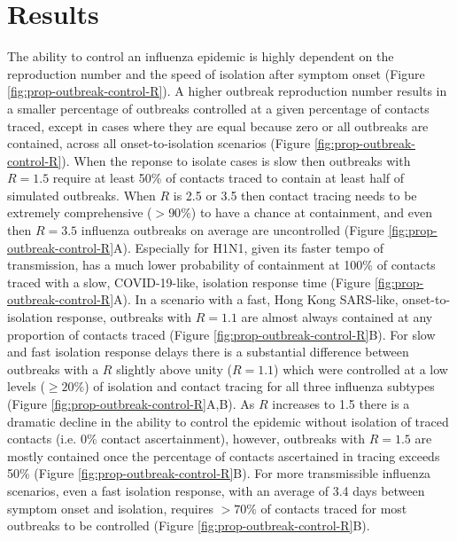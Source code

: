 \documentclass{article}
\begin{document}
\section*{Results}

The ability to control an influenza epidemic is highly dependent on the reproduction number and the speed of isolation after symptom onset (Figure \ref{fig:prop-outbreak-control-R}). A higher outbreak reproduction number results in a smaller percentage of outbreaks controlled at a given percentage of contacts traced, except in cases where they are equal because zero or all outbreaks are contained, across all onset-to-isolation scenarios (Figure \ref{fig:prop-outbreak-control-R}). When the reponse to isolate cases is slow then outbreaks with $R = 1.5$ require at least 50\% of contacts traced to contain at least half of simulated outbreaks. When $R$ is 2.5 or 3.5 then contact tracing needs to be extremely comprehensive ($>90\%$) to have a chance at containment, and even then $R = 3.5$ influenza outbreaks on average are uncontrolled (Figure \ref{fig:prop-outbreak-control-R}A). Especially for H1N1, given its faster tempo of transmission, has a much lower probability of containment at 100\% of contacts traced with a slow, COVID-19-like, isolation response time (Figure \ref{fig:prop-outbreak-control-R}A). In a scenario with a fast, Hong Kong SARS-like, onset-to-isolation response, outbreaks with $R = 1.1$ are almost always contained at any proportion of contacts traced (Figure \ref{fig:prop-outbreak-control-R}B). For slow and fast isolation response delays there is a substantial difference between outbreaks with a $R$ slightly above unity ($R = 1.1$) which were controlled at a low levels ($\geq 20\%$) of isolation and contact tracing for all three influenza subtypes (Figure \ref{fig:prop-outbreak-control-R}A,B). As $R$ increases to 1.5 there is a dramatic decline in the ability to control the epidemic without isolation of traced contacts (i.e. 0\% contact ascertainment), however, outbreaks with $R = 1.5$ are mostly contained once the percentage of contacts ascertained in tracing exceeds 50\% (Figure \ref{fig:prop-outbreak-control-R}B). For more transmissible influenza scenarios, even a fast isolation response, with an average of 3.4 days between symptom onset and isolation, requires $>70\%$ of contacts traced for most outbreaks to be controlled (Figure \ref{fig:prop-outbreak-control-R}B). \\
\end{document}
